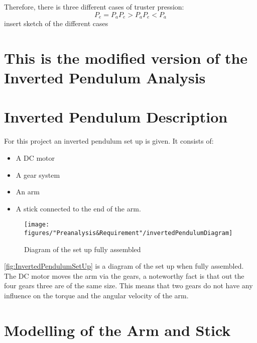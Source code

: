 		Therefore, there is three different cases of truster pression:
		\begin{equation}
		P_{e} = P_{a}
		P_{e} > P_{a}
		P_{e} < P_{a}
		\end{equation}
		 insert sketch of the different cases
		 
		 
		 
		 
		 
		 
		 
		
				\section{This is the modified version of the Inverted Pendulum Analysis}
				
				
				
				
		\section{Inverted Pendulum Description}
		For this project an inverted pendulum set up is given. It consists of:
		\begin{itemize}
			\item A DC motor
			\item A gear system
			\item An arm
			\item A stick connected to the end of the arm.
		\end{itemize}
		
		\begin{figure} [htbp]
			\centering
			\texttt{[image: figures/"Preanalysis\&Requirement"/invertedPendulumDiagram]}
			\caption{Diagram of the set up fully assembled} \label{fig:InvertedPendulumSetUp}
		\end{figure}
		
		\autoref{fig:InvertedPendulumSetUp} is a diagram of the set up when fully assembled. The DC motor moves the arm via the gears, a noteworthy fact is that out the four gears three are of the same size. This means that two gears do not have any influence on the torque and the angular velocity of the arm.
		
		
		
		
		\section{Modelling of the Arm and Stick}\label{sec:StickArm}
		
